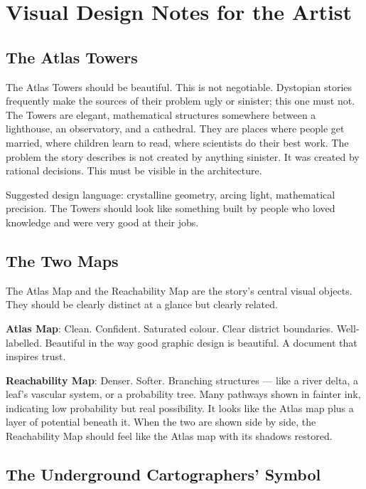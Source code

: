 \documentclass[11pt, letterpaper]{article}
\begin{document}

\section*{Visual Design Notes for the Artist}

\subsection*{The Atlas Towers}

The Atlas Towers should be beautiful. This is not negotiable. Dystopian
stories frequently make the sources of their problem ugly or sinister; this one
must not. The Towers are elegant, mathematical structures somewhere between a
lighthouse, an observatory, and a cathedral. They are places where people get
married, where children learn to read, where scientists do their best work.
The problem the story describes is not created by anything sinister. It was
created by rational decisions. This must be visible in the architecture.

Suggested design language: crystalline geometry, arcing light, mathematical
precision. The Towers should look like something built by people who loved
knowledge and were very good at their jobs.

\subsection*{The Two Maps}

The Atlas Map and the Reachability Map are the story's central visual objects.
They should be clearly distinct at a glance but clearly related.

\textbf{Atlas Map}: Clean. Confident. Saturated colour. Clear district
boundaries. Well-labelled. Beautiful in the way good graphic design is
beautiful. A document that inspires trust.

\textbf{Reachability Map}: Denser. Softer. Branching structures — like a river
delta, a leaf's vascular system, or a probability tree. Many pathways shown
in fainter ink, indicating low probability but real possibility. It looks
like the Atlas map plus a layer of potential beneath it. When the two are
shown side by side, the Reachability Map should feel like the Atlas map with
its shadows restored.

\subsection*{The Underground Cartographers' Symbol}
\end{document}
